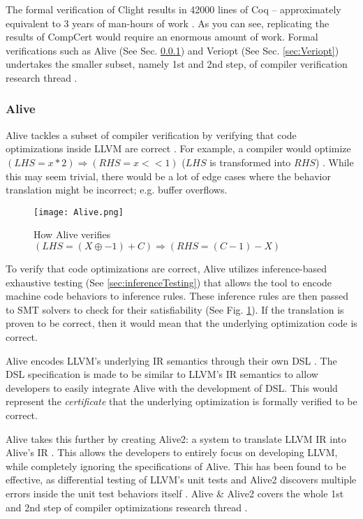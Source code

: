 The formal verification of Clight results in 42000 lines of Coq -- approximately equivalent to 3 years of man-hours 
of work \cite[Sec. 3.3]{compcertVerification}. As you can see, replicating the results of CompCert would require an enormous amount of work.
Formal verifications such as Alive (See Sec. \ref{sec:Alive}) and Veriopt (See Sec. \ref{sec:Veriopt}) undertakes the smaller subset, 
namely 1st and 2nd step, of compiler verification research thread \cite{CompilerOptimization}.

\subsubsection{Alive}
\label{sec:Alive}

Alive tackles a subset of compiler verification by verifying that code optimizations inside LLVM are correct \cite{AliveInLean}. For example, 
a compiler would optimize \((LHS = x * 2) \Longrightarrow (RHS = x << 1)\) (\(LHS\) is transformed into \(RHS\)) \cite[Sec. 2.1]{AliveInLean}. 
While this may seem trivial, there would be a lot of edge cases where the behavior translation might be incorrect; e.g. buffer overflows.

\begin{figure}[ht]
    \centering
    \texttt{[image: Alive.png]}
    \caption{How Alive verifies \((LHS = (X \oplus -1) + C) \Longrightarrow (RHS = (C-1) - X)\) \cite[pp. 1]{AliveInLean}}
    \label{fig:AliveSystem}
\end{figure}

To verify that code optimizations are correct, Alive utilizes inference-based exhaustive testing (See \ref{sec:inferenceTesting}) that allows 
the tool to encode machine code behaviors to inference rules. These inference rules are then passed to SMT solvers to check for their satisfiability 
(See Fig. \ref{fig:AliveSystem}). If the translation is proven to be correct, then it would mean that the underlying optimization code is correct.

Alive encodes LLVM's \cite{llvm} underlying IR semantics through their own DSL \cite[Fig. 1]{AliveInLean}. The DSL specification is made to be 
similar to LLVM's IR semantics to allow developers to easily integrate Alive with the development of DSL. This would represent the 
\emph{certificate} that the underlying optimization is formally verified to be correct.

Alive takes this further by creating Alive2: a system to translate LLVM IR into Alive's IR \cite{Alive2}. This allows the developers to entirely 
focus on developing LLVM, while completely ignoring the specifications of Alive. This has been found to be effective, as differential testing of 
LLVM's unit tests and Alive2 discovers multiple errors inside the unit test behaviors itself \cite[Sec. 8.2]{Alive2}. Alive \& Alive2 covers 
the whole 1st and 2nd step of compiler optimizations research thread \cite[pp. 5]{CompilerOptimization}.

